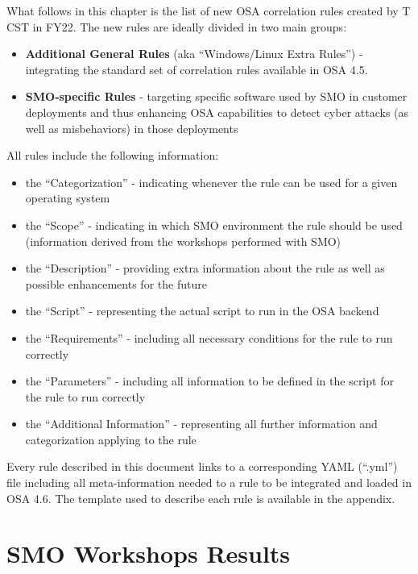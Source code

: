 \documentclass[a4paper]{report}
\begin{document}
What follows in this chapter is the list of new OSA correlation rules created by T CST in FY22. The new rules are ideally divided in two main groups:
	
\begin{itemize}
	\item {\bf Additional General Rules} (aka ``Windows/Linux Extra Rules'') - integrating the standard set of correlation rules available in OSA 4.5.
	\item {\bf SMO-specific Rules} - targeting specific software used by SMO in customer deployments and thus enhancing OSA capabilities to detect cyber attacks (as well as misbehaviors) in those deployments
\end{itemize}

All rules include the following information:

\begin{itemize}
	\item the ``Categorization'' - indicating whenever the rule can be used for a given operating system
	\item the ``Scope'' - indicating in which SMO environment the rule should be used (information derived from the workshops performed with SMO)
	\item the ``Description'' - providing extra information about the rule as well as possible enhancements for the future
	\item the ``Script'' - representing the actual script to run in the OSA backend
	\item the ``Requirements'' - including all necessary conditions for the rule to run correctly
	\item the ``Parameters'' - including all information to be defined in the script for the rule to run correctly
	\item the ``Additional Information'' - representing all further information and categorization applying to the rule
\end{itemize}

Every rule described in this document links to a corresponding YAML (``.yml'') file including all meta-information needed to a rule to be integrated and loaded in OSA 4.6. The template used to describe each rule is available in the appendix.

\pagebreak



\pagebreak

\chapter{SMO Workshops Results}
\end{document}
